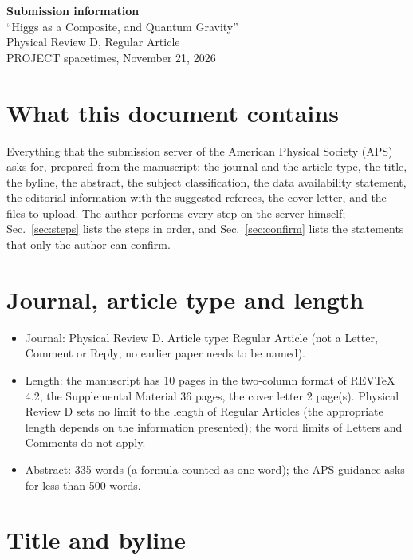 \documentclass[11pt]{article}
\begin{document}
\begin{center}
{\Large\bf Submission information}\\[4pt]
{\large ``Higgs as a Composite, and Quantum Gravity''}\\[2pt]
Physical Review D, Regular Article\\[2pt]
PROJECT spacetimes, November 21, 2026
\end{center}

\section{What this document contains}

Everything that the submission server of the American Physical Society (APS) asks for, prepared from the manuscript: the
journal and the article type, the title, the byline, the abstract, the subject classification, the data availability
statement, the editorial information with the suggested referees, the cover letter, and the files to upload. The author
performs every step on the server himself; Sec.~\ref{sec:steps} lists the steps in order, and Sec.~\ref{sec:confirm} lists
the statements that only the author can confirm.

\section{Journal, article type and length}

\begin{itemize}
\item Journal: Physical Review D. Article type: Regular Article (not a Letter, Comment or Reply; no earlier paper needs to be
named).
\item Length: the manuscript has 10 pages in the two-column format of REVTeX 4.2, the Supplemental Material
36 pages, the cover letter 2 page(s). Physical Review D sets no limit to the length of Regular Articles
(the appropriate length depends on the information presented); the word limits of Letters and Comments do not apply.
\item Abstract: 335 words (a formula counted as one word); the APS guidance asks for less than 500 words.
\end{itemize}

\section{Title and byline}
\label{sec:title}
\end{document}
